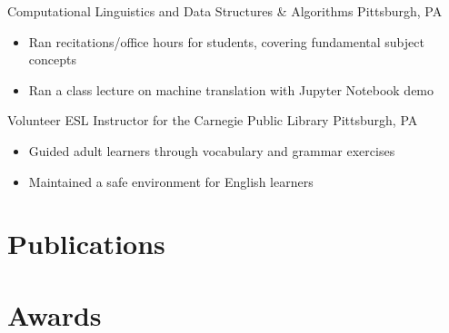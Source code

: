 \documentclass[11pt]{tianyicv}
\begin{document}
{Computational Linguistics and Data Structures \& Algorithms}
{Pittsburgh, PA}{}{
    \begin{itemize}
        \item Ran recitations/office hours for students, covering fundamental subject concepts
        \item Ran a class lecture on machine translation with Jupyter Notebook demo
    \end{itemize}
}

{Volunteer ESL Instructor for the Carnegie Public Library}
{Pittsburgh, PA}{}{
    \begin{itemize}
        \item Guided adult learners through vocabulary and grammar exercises
        \item Maintained a safe environment for English learners
    \end{itemize}
}

\section{Publications}



\begin{publications}[INTERSPEECH]
\end{publications}

\begin{publications}
\end{publications}

\section{Awards}

\end{document}

